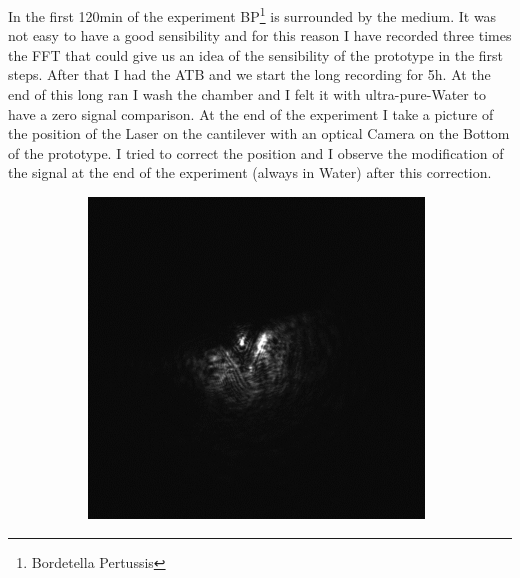 \documentclass[11pt, a4paper]{article}
\begin{document}
In the first 120min of the experiment BP\footnote{Bordetella Pertussis} is surrounded by the medium. It was not easy to have a good sensibility and for this reason I have recorded three times the FFT that could give us an idea of the sensibility of the prototype in the first steps. After that I had the ATB and we start the long recording for 5h. At the end of this long ran I wash the chamber and I felt it with ultra-pure-Water to have a zero signal comparison. At the end of the experiment I take a picture of the position of the Laser on the cantilever with an optical Camera on the Bottom of the prototype. I tried to correct the position and I observe the modification of the signal at the end of the experiment (always in Water) after this correction. 

\begin{figure}[h] 
\centering
	\begin{subfigure}{0.245\linewidth}
		\centering
		\includegraphics[width=1\linewidth]{FFT/Lp_0208_end}%
		\caption{}\label{fig:2807}
	\end{subfigure}
	\begin{subfigure}{0.245\linewidth}
		\centering

\end{subfigure}
\end{figure}
\end{document}
